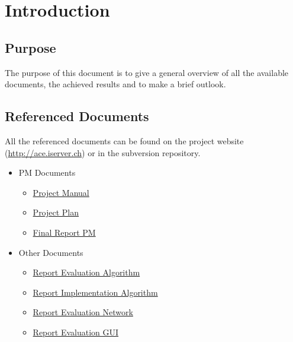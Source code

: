 \documentclass[11pt,a4paper]{article}
\begin{document}
\setlength{\parindent}{0pt}


\newpage

\tableofcontents
\newpage

\listoftables
\listoffigures
\newpage


\section{Introduction}
\subsection{Purpose}
The purpose of this document is to give a general overview of all the available documents, the achieved results and to make a brief outlook.

\subsection{Referenced Documents}
All the referenced documents can be found on the project website (\href{http://ace.iserver.ch/}{http://ace.iserver.ch}) or in the subversion repository.
\begin{itemize}
 \item PM Documents
 \begin{itemize}
  \item \href{http://ace.iserver.ch:81/repos/ace/ace/trunk/doc/pdf/projectmanual.pdf}{Project Manual}
  \item \href{http://ace.iserver.ch:81/repos/ace/ace/trunk/doc/pdf/projektplan.pdf}{Project Plan}
  \item \href{http://ace.iserver.ch:81/repos/ace/ace/trunk/doc/pdf/erfahrungsbericht.pdf}{Final Report PM}
 \end{itemize}
 \item Other Documents
 \begin{itemize}
  \item \href{http://ace.iserver.ch:81/repos/ace/ace/trunk/doc/pdf/algorithm.pdf}{Report Evaluation Algorithm}
  \item \href{http://ace.iserver.ch:81/repos/ace/ace/trunk/doc/pdf/implementation-algorithm.pdf}{Report Implementation Algorithm}
  \item \href{http://ace.iserver.ch:81/repos/ace/ace/trunk/doc/pdf/network.pdf}{Report Evaluation Network}
  \item \href{http://ace.iserver.ch:81/repos/ace/ace/trunk/doc/pdf/gui.pdf}{Report Evaluation GUI}
 \end{itemize}
\end{itemize}
\end{document}
